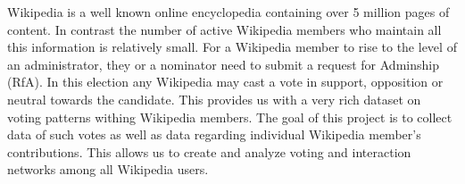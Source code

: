 Wikipedia is a well known online encyclopedia containing over 5 million pages of content. In contrast the number of active Wikipedia members who maintain all this information is relatively small. 
For a Wikipedia member to rise to the level of an administrator, they or a nominator need to submit a request for Adminship (RfA). In this election any Wikipedia may cast a vote in support, opposition or neutral towards the candidate.
This provides us with a very rich dataset on voting patterns withing Wikipedia members. The goal of this project is to collect data of such votes as well as data regarding individual Wikipedia member's contributions.
This allows us to create and analyze voting and interaction networks among all Wikipedia users.